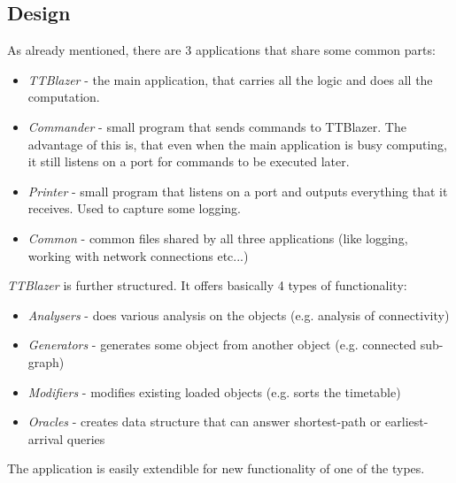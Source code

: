 \subsection{Design}

	As already mentioned, there are 3 applications that share some common parts:
	\begin{itemize}
		\item \textit{TTBlazer} - the main application, that carries all the logic and does all the computation.
		\item \textit{Commander} - small program that sends commands to TTBlazer. The advantage of this is, that even when the main application is busy computing, it still listens on a port for commands to be executed later.
		\item \textit{Printer} - small program that listens on a port and outputs everything that it receives. Used to capture some logging.
		\item \textit{Common} - common files shared by all three applications (like logging, working with network connections etc...)
	\end{itemize}
	\hspace{\fill}
	
	\textit{TTBlazer} is further structured. It offers basically 4 types of functionality:
	\begin{itemize}
		\item \textit{Analysers} - does various analysis on the objects (e.g. analysis of connectivity)
		\item \textit{Generators} - generates some object from another object (e.g. connected sub-graph)
		\item \textit{Modifiers} - modifies existing loaded objects (e.g. sorts the timetable)
		\item \textit{Oracles} - creates data structure that can answer shortest-path or earliest-arrival queries
	\end{itemize}
	\hspace{\fill}
	
	The application is easily extendible for new functionality of one of the types.
